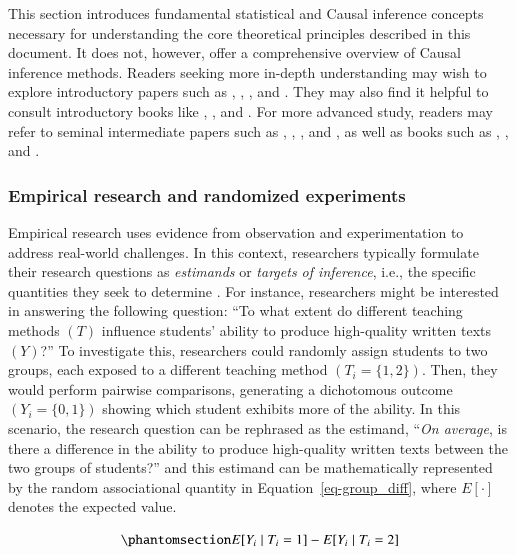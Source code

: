 \documentclass[
  authoryear,
  review,
  1p]{elsarticle}
\begin{document}
This section introduces fundamental statistical and Causal inference
concepts necessary for understanding the core theoretical principles
described in this document. It does not, however, offer a comprehensive
overview of Causal inference methods. Readers seeking more in-depth
understanding may wish to explore introductory papers such as
\citet{Pearl_2010}, \citet{Rohrer_2018}, \citet{Pearl_2019}, and
\citet{Cinelli_et_al_2020}. They may also find it helpful to consult
introductory books like \citet{Pearl_et_al_2018}, \citet{Neal_2020}, and
\citet{McElreath_2020}. For more advanced study, readers may refer to
seminal intermediate papers such as \citet{Neyman_et_al_1923},
\citet{Rubin_1974}, \citet{Spirtes_et_al_1991}, and \citet{Sekhon_2009},
as well as books such as \citet{Pearl_2009}, \citet{Morgan_et_al_2014},
and \citet{Hernan_et_al_2025}.

\subsubsection{Empirical research and randomized
experiments}\label{sec-appendixB1}

Empirical research uses evidence from observation and experimentation to
address real-world challenges. In this context, researchers typically
formulate their research questions as \emph{estimands} or \emph{targets
of inference}, i.e., the specific quantities they seek to determine
\citep{Everitt_et_al_2010}. For instance, researchers might be
interested in answering the following question: ``To what extent do
different teaching methods \((T)\) influence students' ability to
produce high-quality written texts \((Y)\)?'' To investigate this,
researchers could randomly assign students to two groups, each exposed
to a different teaching method \((T_{i} = \{1,2\})\). Then, they would
perform pairwise comparisons, generating a dichotomous outcome
\((Y_{i} = \{0,1\})\) showing which student exhibits more of the
ability. In this scenario, the research question can be rephrased as the
estimand, ``\emph{On average}, is there a difference in the ability to
produce high-quality written texts between the two groups of students?''
and this estimand can be mathematically represented by the random
associational quantity in Equation~\ref{eq-group_diff}, where
\(E[\cdot]\) denotes the expected value.

\begin{equation}\protect\phantomsection\label{eq-group_diff}{
E[Y_{i} \mid T_{i}=1] - E[Y_{i} \mid T_{i}=2]
}\end{equation}
\end{document}
